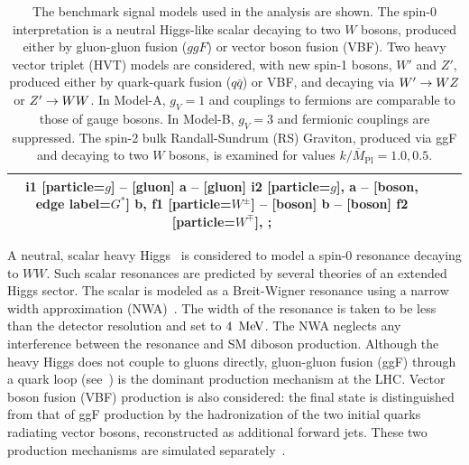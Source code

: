 \begin{table}[tbp]
\begin{center}
\begin{tabular}{ccc}
{i1 [particle=\(g\)] -- [gluon] a -- [gluon] i2 [particle=\(g\)],
a -- [boson, edge label={\(G^*\)}] b,
f1 [particle=\(W^{\pm}\)] -- [boson] b -- [boson] f2 [particle={\(W^{\mp}\)}],
}; \\
\hline\hline 
\end{tabular}
\caption[Benchmark signal models and leading order Feynman diagrams]{The benchmark signal models used in the analysis are shown. The spin-0 interpretation is a neutral Higgs-like scalar decaying to two $W$ bosons, produced either by gluon-gluon fusion ($ggF$) or vector boson fusion (VBF). Two heavy vector triplet (HVT) models are considered, with new spin-1 bosons, $W'$ and $Z'$, produced either by quark-quark fusion ($q\bar{q}$) or VBF, and decaying via $W'\rightarrow WZ$ or $Z'\rightarrow WW$.  In Model-A, $g_V=1$ and couplings to fermions are comparable to those of gauge bosons. In Model-B, $g_V=3$ and fermionic couplings are suppressed. The spin-2 bulk Randall-Sundrum (RS) Graviton, produced via ggF and decaying to two $W$ bosons, is examined for values $k/\overline{M}_{\textrm{Pl}}=1.0, 0.5$. }
\label{tab:bench_models}
\end{center}
\end{table}

A neutral, scalar heavy Higgs~\cite{heavy_higgs_1, heavy_higgs_2} is considered to model a spin-0 resonance decaying to $WW$. Such scalar resonances are predicted by several theories of an extended Higgs sector. The scalar is modeled as a Breit-Wigner resonance using a narrow width approximation (NWA)~\cite{nwa_info}.
The width of the resonance is taken to be less than the detector resolution and set to $4\,\MeV$. The NWA neglects any interference between the resonance and SM diboson production. Although the heavy Higgs does not couple to gluons directly, gluon-gluon fusion (ggF) through a quark loop (see~\Tab{\ref{tab:bench_models}}) is the dominant production mechanism at the LHC. Vector boson fusion (VBF) production is also considered: the final state is distinguished from that of ggF production by the hadronization of the two initial quarks radiating vector bosons, reconstructed as additional forward jets. These two production mechanisms are simulated separately~\cite{heavy_higgs_ggF, heavy_higgs_VBF}.

